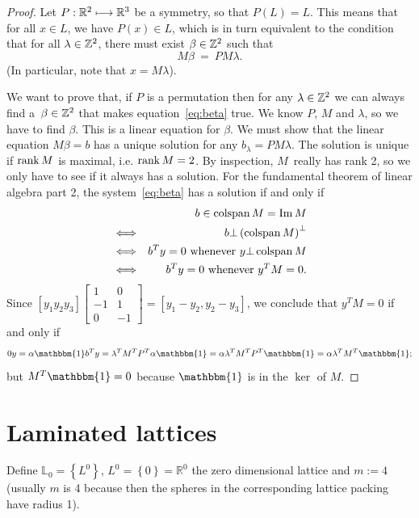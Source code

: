 \begin{proof}
  Let $P:\mathbb{R}^{2}\longmapsto\mathbb{R}^{3}$ be a symmetry, so that $P(L)=L$. This means that for
  all $x\in L$, we have $P(x)\in L$, which is in turn equivalent to the condition that for
  all $\lambda\in\mathbb{Z}^{2}$, there must exist $\beta\in\mathbb{Z}^{2}$ such that
  \begin{equation}\label{eq:beta}
    M\beta
    \ = \
    PM\lambda.
  \end{equation}
  (In particular, note that $x=M\lambda$).

  We want to prove that, if $P$ is a permutation then for any $\lambda\in\mathbb{Z}^{2}$ we can
  always find a~$\beta\in\mathbb{Z}^2$ that makes equation~\eqref{eq:beta} true.  We know $P$,
  $M$ and $\lambda$, so we have to find $\beta$. This is a linear equation for $\beta$.
  We must show that the linear equation $M\beta=b$ has a unique solution for any
  $b_\lambda =PM\lambda$.  The solution is unique if $\operatorname{rank} M$ is maximal, i.e. $\operatorname{rank}
  M=2$. By inspection, $M$~really has rank 2, so we only have to see if it always has a
  solution.  For the fundamental theorem of linear algebra part 2, the system~\eqref{eq:beta} has a
  solution if and only if
\begin{eqnarray*}
  && b\in \operatorname{colspan} M=\operatorname{Im} M 
  \\ &\Longleftrightarrow&
  b\bot\left(\operatorname{colspan} M\right)^{\bot}
  \\ &\Longleftrightarrow&
  b^{T}y=0 \text{ whenever } y\bot \operatorname{colspan} M 
  \\ &\Longleftrightarrow&
  b^{T}y=0 \text{ whenever } y^{T}M=0.
\end{eqnarray*}
Since  $\left[y_1 y_2 y_3\right]\left[\begin{smallmatrix}
1 & 0 \\
-1 & 1 \\
0 & -1\end{smallmatrix}\right]=\left[y_1 - y_2, y_2 - y_3\right]$, we conclude that
$y^{T}M=0$ if and only if
\[
0 y=\alpha\mathbbm{1}
b^{T}y=\lambda^{T}M^{T}P^{T}\alpha\mathbbm{1}=\alpha\lambda^{T}M^{T}P^{T}\mathbbm{1}=\alpha\lambda^{T}M^{T}\mathbbm{1};
\]
but $M^{T}\mathbbm{1}=0$ because $\mathbbm{1}$ is in the $\ker$ of $M$.
\end{proof}


\section{Laminated lattices}


Define $\mathbb{L}_0=\left\{L^{0}\right\}$, $L^{0}=\left\{0\right\}=\mathbb{R}^{0}$ the
zero dimensional lattice and $m:=4$ (usually $m$ is 4 because then the spheres in the
corresponding lattice packing have radius 1).

